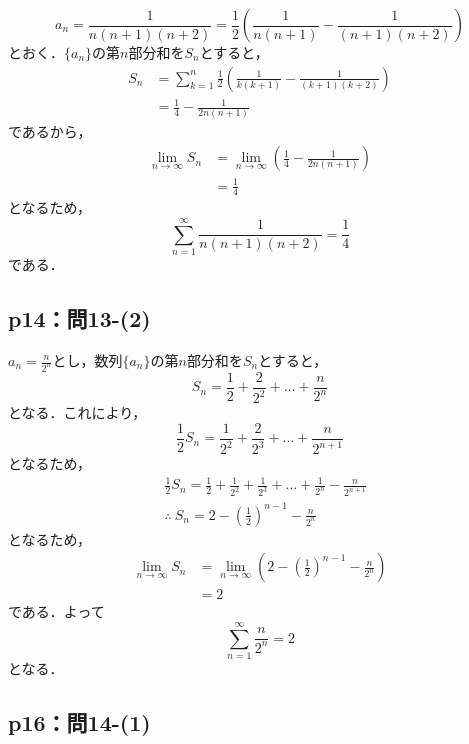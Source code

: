 \documentclass[uplatex,dvipdfmx,a4paper,10pt,fleqn]{jsarticle}
\newenvironment{tleftbar}{\begin{tbleftline}\setlength{\parindent}{1zw}}{\end{tbleftline}}
\begin{document}
\begin{tleftbar}
\[
   a_n = \frac{1}{n (n+1)(n+2)} = \frac{1}{2} \left ( \frac{1}{n(n+1)}- \frac{1}{(n+1)(n+2)} \right)
\]
とおく．$\{ a_n \}$の第$n$部分和を$S_n$とすると，
\begin{align*} 
    S_n & = \sum_{k=1}^{n}  \frac{1}{2} \left ( \frac{1}{k(k+1)}-\frac{1}{(k+1)(k+2)} \right) \\
    & = \frac{1}{4} - \frac{1}{2n(n+1)}
\end{align*} 
であるから，
\begin{align*}
    \lim_{n \to \infty} S_n &= \lim_{n \to \infty} \left (  \frac{1}{4} - \frac{1}{2n(n+1)} \right) \\
    &= \frac{1}{4}
\end{align*}
となるため，
\[
    \sum_{n=1}^{\infty} \frac{1}{n (n+1)(n+2)} = \frac{1}{4}
\]
である．
\end{tleftbar}


\subsection*{p14：問13-(2)}

\begin{tleftbar}
    $a_n = \frac{n}{2^n}$とし，数列$\{ a_n \}$の第$n$部分和を$S_n$とすると，
    \[
        S_n = \frac{1}{2}+ \frac{2}{2^2}+\dots + \frac{n}{2^n}
    \]
    となる．これにより，
    \[
        \frac{1}{2} S_n = \frac{1}{2^2}+\frac{2}{2^3}+\dots + \frac{n}{2^{n+1}}
    \]
    となるため，
    \begin{align*} 
        & \frac{1}{2} S_n = \frac{1}{2}+ \frac{1}{2^2}  +\frac{1}{2^3}+\dots +\frac{1}{2^n}-\frac{n}{2^{n+1}} \\
       & \therefore ~ S_n = 2- \left (\frac{1}{2} \right)^{n-1} -\frac{n}{2^n}
    \end{align*} 
    となるため，
    \begin{align*}
        \lim_{n \to \infty} S_n &= \lim_{n \to \infty}\left ( 2- \left (\frac{1}{2} \right)^{n-1} -\frac{n}{2^n} \right ) \\
        & = 2
    \end{align*}
    である．よって
    \[
        \sum_{n=1}^{\infty} \frac{n}{2^n}=2
    \]
    となる．
\end{tleftbar}


\subsection*{p16：問14-(1)}
\end{document}
